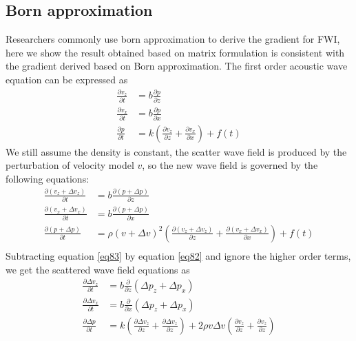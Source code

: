 \documentclass[revised,endfloat]{geophysics}
\begin{document}
\subsection{Born approximation}
Researchers commonly use born approximation to derive the gradient for FWI, here we show the result obtained based on matrix formulation is consistent with the gradient derived based on Born approximation.  
The first order acoustic wave equation can be expressed as
\begin{equation}
\begin{split}
 \frac{\partial v_z}{\partial t} &=  b \frac{\partial p}{\partial z}  \\
 \frac{\partial v_x}{\partial t} &=  b \frac{\partial p}{\partial x}  \\
\frac{\partial p}{\partial t} &= k \left(\frac{\partial v_z}{\partial z} + \frac{\partial v_x}{\partial x} \right) + f(t)
\end{split}
\label{eq82}
\end{equation}
We still assume the density is constant, the scatter wave field is produced by the perturbation of velocity model $v$, so the new wave field is governed by the following equations:
 \begin{equation}
 \begin{split}
\frac{\partial (v_z + \Delta v_z)}{\partial t} &=  b \frac{\partial (p + \Delta p) }{\partial z} \\
\frac{\partial (v_x + \Delta v_x)}{\partial t} &=  b \frac{\partial (p + \Delta p) }{\partial x} \\
\frac{\partial (p + \Delta p)}{\partial t} &= \rho (v+\Delta v)^2 \left( \frac{\partial (v_z + \Delta v_z)}{\partial z} + \frac{\partial( v_x +\Delta v_x)}{\partial x} \right)+ f(t)\\
\end{split}
\label{eq83}
 \end{equation}
Subtracting equation \ref{eq83} by equation \ref{eq82} and ignore the higher order terms, we get the scattered wave field equations as
\begin{equation}
\begin{split}
\frac{\partial \Delta v_z}{\partial t} &= b \frac{\partial }{\partial z} \left(\Delta p_z  + \Delta p_x \right) \\
\frac{\partial \Delta v_x}{\partial t} &=  b \frac{\partial }{\partial x} \left(\Delta p_z  + \Delta p_x \right) \\
\frac{\partial  \Delta p}{\partial t} &= k \left( \frac{\partial  \Delta v_z}{\partial z} +  \frac{\partial  \Delta v_z}{\partial z} \right) + 2\rho v \Delta v \left( \frac{\partial v_z}{\partial z} +  \frac{\partial v_z}{\partial z} \right) \\
\end{split}
\label{eq84}
\end{equation}
\end{document}
